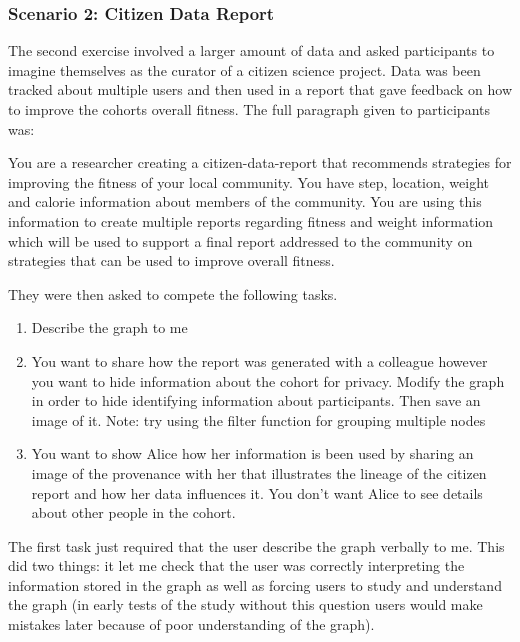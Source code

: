 \subsubsection{Scenario 2: Citizen Data Report}
\label{ssub:Scenario 2: Citizen Data Report}

The second exercise involved a larger amount of data and asked participants to imagine themselves as the curator of a citizen science project. Data was been tracked about multiple users and then used in a report that gave feedback on how to improve the cohorts overall fitness. The full paragraph given to participants was:

\begin{absolutelynopagebreak}
\begin{framed}
You are a researcher creating a citizen-data-report that recommends strategies for improving the fitness of your local community. You have step, location, weight and calorie information about members of the community. You are using this information to create multiple reports regarding fitness and weight information which will be used to support a final report addressed to the community on strategies that can be used to improve overall fitness. 
\end{framed}
\end{absolutelynopagebreak}

They were then asked to compete the following tasks. 

\begin{enumerate}[label=\arabic*.]
	\item Describe the graph to me
	\item You want to share how the report was generated with a colleague however you want to hide information about the cohort for privacy. Modify the graph in order to hide identifying information about participants. Then save an image of it. Note: try using the filter function for grouping multiple nodes
	\item You want to show Alice how her information is been used by sharing an image of the provenance with her that illustrates the lineage of the citizen report and how her data influences it. You don’t want Alice to see details about other people in the cohort. 
\end{enumerate}

The first task just required that the user describe the graph verbally to me. This did two things: it let me check that the user was correctly interpreting the information stored in the graph as well as forcing users to study and understand the graph (in early tests of the study without this question users would make mistakes later because of poor understanding of the graph).

